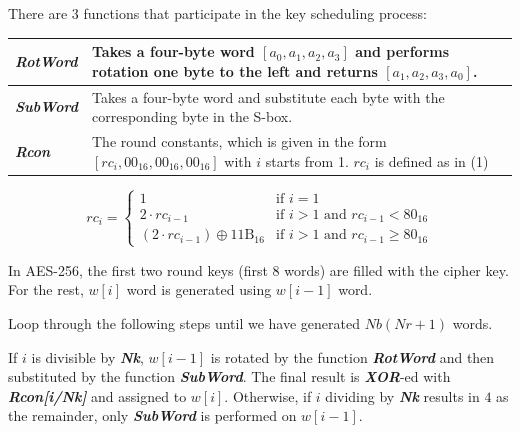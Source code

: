 \documentclass[a4paper, 10pt]{article}
\begin{document}
\begin{multicols}{2}
                There are 3 functions that participate in the key scheduling process:

                    \setlength{\tabcolsep}{5pt} %
                    \renewcommand{\arraystretch}{1.5} %
                    \noindent
                        \begin{tabular}{m{2cm} m{6cm}}
                            \textbf{\textit{RotWord}} & Takes a four-byte word $[a_{0},a_{1},a_{2},a_{3}]$ and performs rotation one byte to the left and returns $[a_{1},a_{2},a_{3},a_{0}]$.\\
                            \hline
                            \textbf{\textit{SubWord}} & Takes a four-byte word and substitute each byte with the corresponding byte in the S-box.\\
                            \hline
                            \textbf{\textit{Rcon}} & The round constants, which is given in the form $[rc_{i},00_{16},00_{16},00_{16}]$ with $i$ starts from 1. $rc_{i}$ is defined as in (1)\\
                        \end{tabular}

                \begin{equation}
                    rc_{i}=
                    \begin{cases}
                        1 & \text{if } i=1\\
                        2 \cdot  rc_{i-1} & \text{if } i>1 \text{ and } rc_{i-1}<80_{16}\\
                        \left(2 \cdot  rc_{i-1}\right)\oplus 11\text{B}_{16} & \text{if } i>1 \text{ and } rc_{i-1} \ge 80_{16}
                    \end{cases}
                \end{equation}

                In AES-256, the first two round keys (first 8 words) are filled with the cipher key. For the rest, $w[i]$ word is generated using $w[i-1]$ word.

                Loop through the following steps until we have generated $Nb(Nr+1)$ words.

                If $i$ is divisible by \textbf{\textit{Nk}}, $w[i-1]$ is rotated by the function \textbf{\textit{RotWord}} and then substituted by the function \textbf{\textit{SubWord}}. The final result is \textbf{\textit{XOR}}-ed with \textbf{\textit{Rcon[i/Nk]}} and assigned to $w[i]$. Otherwise, if $i$ dividing by \textbf{\textit{Nk}} results in $4$ as the remainder, only \textbf{\textit{SubWord}} is performed on $w[i-1]$.


\end{multicols}
\end{document}
